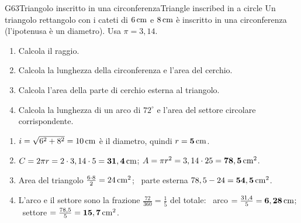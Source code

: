 \begin{esercizio}{G6}{3}{Triangolo inscritto in una circonferenza}{Triangle inscribed in a circle}
Un triangolo rettangolo con i cateti di $6\,\mathrm{cm}$ e $8\,\mathrm{cm}$ è inscritto in una circonferenza (l'ipotenusa è un diametro). Usa $\pi=3,14$.
\begin{enumerate}
\item Calcola il raggio. 
\item Calcola la lunghezza della circonferenza e l'area del cerchio. 
\item Calcola l'area della parte di cerchio esterna al triangolo. 
\item Calcola la lunghezza di un arco di $72^\circ$ e l'area del settore circolare corrispondente. 
\end{enumerate}
\begin{center}
\end{center}
\end{esercizio}
\begin{solbox}
\begin{enumerate}
\item $i=\sqrt{6^2+8^2}=10\,\mathrm{cm}$ è il diametro, quindi $r=\mathbf{5\,\mathrm{cm}}$.
\item $C=2\pi r=2\cdot3,14\cdot5=\mathbf{31,4\,\mathrm{cm}}$; \quad $A=\pi r^2=3,14\cdot25=\mathbf{78,5\,\mathrm{cm^2}}$.
\item Area del triangolo $\frac{6\cdot8}{2}=24\,\mathrm{cm^2}$; \ parte esterna $78,5-24=\mathbf{54,5\,\mathrm{cm^2}}$.
\item L'arco e il settore sono la frazione $\frac{72}{360}=\frac15$ del totale: \ arco $=\frac{31,4}{5}=\mathbf{6,28\,\mathrm{cm}}$; \ settore $=\frac{78,5}{5}=\mathbf{15,7\,\mathrm{cm^2}}$.
\end{enumerate}
\end{solbox}
